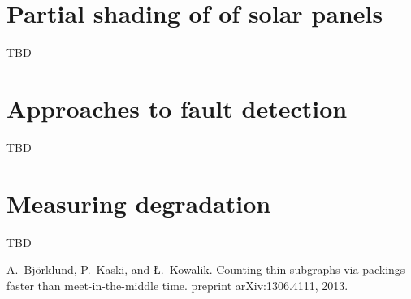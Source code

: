 \documentclass[a4paper,11pt]{report}
\begin{document}
\section{Partial shading of of solar panels}
TBD

\section{Approaches to fault detection}
TBD

\section{Measuring degradation}
TBD

\begin{thebibliography}{10}

A.~{Bj{\"o}rklund}, P.~Kaski, and {\L}.~Kowalik.
\newblock Counting thin subgraphs via packings faster than meet-in-the-middle time.
 preprint arXiv:1306.4111, 2013.

\end{thebibliography}
\end{document}
